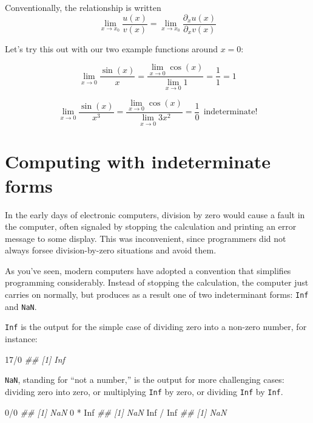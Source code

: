 \documentclass[
  letterpaper,
  DIV=11,
  numbers=noendperiod,
  oneside]{scrreprt}
\newenvironment{Shaded}{\begin{snugshade}}{\end{snugshade}}
\newcommand{\ConstantTok}[1]{\textcolor[rgb]{0.56,0.35,0.01}{#1}}
\newcommand{\DecValTok}[1]{\textcolor[rgb]{0.68,0.00,0.00}{#1}}
\newcommand{\DocumentationTok}[1]{\textcolor[rgb]{0.37,0.37,0.37}{\textit{#1}}}
\newcommand{\SpecialCharTok}[1]{\textcolor[rgb]{0.37,0.37,0.37}{#1}}
\begin{document}
Conventionally, the relationship is written
\[\lim_{x\rightarrow x_0} \frac{u(x)}{v(x)} = \lim_{x\rightarrow x_0} \frac{\partial_x u(x)}{\partial_x v(x)}\]

Let's try this out with our two example functions around \(x=0\):

\[\lim_{x\rightarrow 0} \frac{\sin(x)}{x} = \frac{\lim_{x\rightarrow 0} \cos(x)}{\lim_{x \rightarrow 0} 1} = \frac{1}{1} = 1\]

\[\lim_{x\rightarrow 0} \frac{\sin(x)}{x^3} = \frac{\lim_{x\rightarrow 0} \cos(x)}{\lim_{x \rightarrow 0} 3x^2} = \frac{1}{0} \ \ \text{indeterminate}!\]

\hypertarget{computing-with-indeterminate-forms}{%
\section{Computing with indeterminate
forms}\label{computing-with-indeterminate-forms}}

In the early days of electronic computers, division by zero would cause
a fault in the computer, often signaled by stopping the calculation and
printing an error message to some display. This was inconvenient, since
programmers did not always forsee division-by-zero situations and avoid
them.

As you've seen, modern computers have adopted a convention that
simplifies programming considerably. Instead of stopping the
calculation, the computer just carries on normally, but produces as a
result one of two indeterminant forms: \texttt{Inf} and \texttt{NaN}.

\texttt{Inf} is the output for the simple case of dividing zero into a
non-zero number, for instance:

\begin{Shaded}
\begin{Highlighting}[]
\DecValTok{17}\SpecialCharTok{/}\DecValTok{0}
\DocumentationTok{\#\# [1] Inf}
\end{Highlighting}
\end{Shaded}

\texttt{NaN}, standing for ``not a number,'' is the output for more
challenging cases: dividing zero into zero, or multiplying \texttt{Inf}
by zero, or dividing \texttt{Inf} by \texttt{Inf}.

\begin{Shaded}
\begin{Highlighting}[]
\DecValTok{0}\SpecialCharTok{/}\DecValTok{0}
\DocumentationTok{\#\# [1] NaN}
\DecValTok{0} \SpecialCharTok{*} \ConstantTok{Inf}
\DocumentationTok{\#\# [1] NaN}
\ConstantTok{Inf} \SpecialCharTok{/} \ConstantTok{Inf}
\DocumentationTok{\#\# [1] NaN}
\end{Highlighting}
\end{Shaded}
\end{document}
